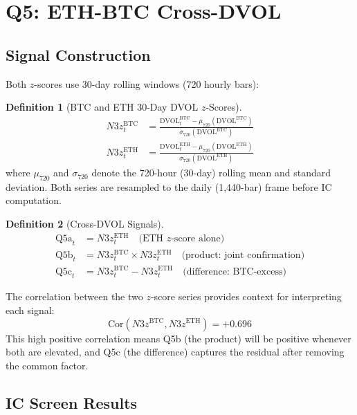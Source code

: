 \documentclass[12pt, a4paper]{article}
\theoremstyle{plain}
\theoremstyle{definition}
\newtheorem{definition}{Definition}[section]
\newcommand{\Cor}{\mathrm{Cor}}
\newcommand{\DVOL}{\mathrm{DVOL}}
\begin{document}
\section{Q5: ETH-BTC Cross-DVOL}
\label{sec:q5}

\subsection{Signal Construction}

Both $z$-scores use 30-day rolling windows (720 hourly bars):

\begin{definition}[BTC and ETH 30-Day DVOL $z$-Scores]
  \begin{align}
    N3z^{\mathrm{BTC}}_t &= \frac{\DVOL^{\mathrm{BTC}}_t -
      \mu_{720}(\DVOL^{\mathrm{BTC}})}
      {\sigma_{720}(\DVOL^{\mathrm{BTC}})} \\
    N3z^{\mathrm{ETH}}_t &= \frac{\DVOL^{\mathrm{ETH}}_t -
      \mu_{720}(\DVOL^{\mathrm{ETH}})}
      {\sigma_{720}(\DVOL^{\mathrm{ETH}})}
  \end{align}
  where $\mu_{720}$ and $\sigma_{720}$ denote the 720-hour (30-day)
  rolling mean and standard deviation.  Both series are resampled to
  the daily (1{,}440-bar) frame before IC computation.
\end{definition}

\begin{definition}[Cross-DVOL Signals]
  \begin{align}
    \text{Q5a}_t &= N3z^{\mathrm{ETH}}_t
      \quad\text{(ETH $z$-score alone)} \\
    \text{Q5b}_t &= N3z^{\mathrm{BTC}}_t \times N3z^{\mathrm{ETH}}_t
      \quad\text{(product: joint confirmation)} \\
    \text{Q5c}_t &= N3z^{\mathrm{BTC}}_t - N3z^{\mathrm{ETH}}_t
      \quad\text{(difference: BTC-excess)}
  \end{align}
\end{definition}

The correlation between the two $z$-score series provides context for
interpreting each signal:
\[
  \Cor(N3z^{\mathrm{BTC}}, N3z^{\mathrm{ETH}}) = +0.696
\]
This high positive correlation means Q5b (the product) will be positive
whenever both are elevated, and Q5c (the difference) captures the residual
after removing the common factor.

\subsection{IC Screen Results}
\end{document}
